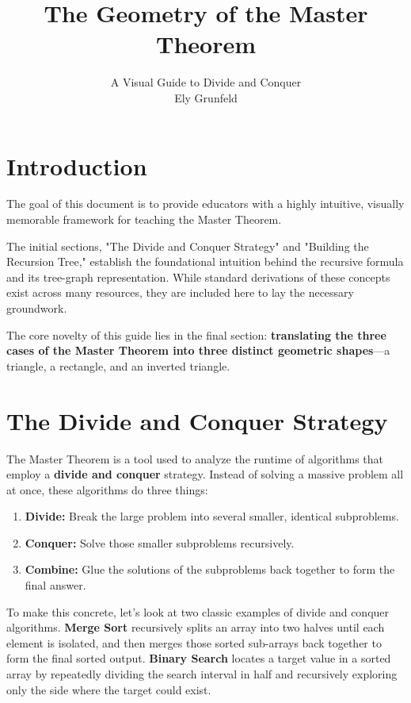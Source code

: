 \documentclass[11pt, a4paper]{article}
\title{\Huge \textbf{The Geometry of the Master Theorem}}
\author{\Large A Visual Guide to Divide and Conquer \\ \vspace{0.2cm} \large Ely Grunfeld}
\date{} %
\begin{document}
\maketitle

\section*{Introduction}

The goal of this document is to provide educators with a highly intuitive, visually memorable framework for teaching the Master Theorem. 

The initial sections, "The Divide and Conquer Strategy" and "Building the Recursion Tree," establish the foundational intuition behind the recursive formula and its tree-graph representation. While standard derivations of these concepts exist across many resources, they are included here to lay the necessary groundwork. 

The core novelty of this guide lies in the final section: \textbf{translating the three cases of the Master Theorem into three distinct geometric shapes}—a triangle, a rectangle, and an inverted triangle.

\newpage
\section*{The Divide and Conquer Strategy}

The Master Theorem is a tool used to analyze the runtime of algorithms that employ a \textbf{divide and conquer} strategy. Instead of solving a massive problem all at once, these algorithms do three things:
\begin{enumerate}
    \item \textbf{Divide:} Break the large problem into several smaller, identical subproblems.
    \item \textbf{Conquer:} Solve those smaller subproblems recursively.
    \item \textbf{Combine:} Glue the solutions of the subproblems back together to form the final answer.
\end{enumerate}
To make this concrete, let's look at two classic examples of divide and conquer algorithms. \textbf{Merge Sort} recursively splits an array into two halves until each element is isolated, and then merges those sorted sub-arrays back together to form the final sorted output. \textbf{Binary Search} locates a target value in a sorted array by repeatedly dividing the search interval in half and recursively exploring only the side where the target could exist.
\end{document}
